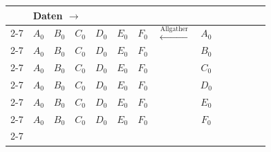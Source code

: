 \begin{figure}[tbp]
      \begin{subfigure}[l]{0.87\textwidth}
	\begin{tabular}[]{m{0.2cm} m{0.3cm}|m{0.3cm}|m{0.3cm}|m{0.3cm}|m{0.3cm}|m{0.3cm} m{1.5cm} m{0.3cm}|m{0.3cm}|m{0.3cm}|m{0.3cm}|m{0.3cm}|m{0.3cm}}
	  & \multicolumn{13}{l}{Daten $\longrightarrow$}\\
	  \cline{2-7} \cline{9-14}
	  \multirow{6}{*}{\begin{turn}{-90} Prozesse $\longrightarrow$ \end{turn}}
	  &\multicolumn{1}{|c|}{$A_0$}&$B_0$&$C_0$&$D_0$&$E_0$&\multicolumn{1}{|m{0.3cm}|}{$F_0$} &\multirow{6}{*}{\large $\xleftarrow{\text{Allgather}}$} & \multicolumn{1}{|c|}{$A_0$}& & & & &\multicolumn{1}{|m{0.3cm}|}{ }\\
	  \cline{2-7} \cline{9-14}
	  &\multicolumn{1}{|c|}{$A_0$}&$B_0$&$C_0$&$D_0$&$E_0$&\multicolumn{1}{|m{0.3cm}|}{$F_0$}                         & & \multicolumn{1}{|c|}{$B_0$}& & & & &\multicolumn{1}{|c|}{ }\\
	  \cline{2-7} \cline{9-14}
	  &\multicolumn{1}{|c|}{$A_0$}&$B_0$&$C_0$&$D_0$&$E_0$&\multicolumn{1}{|m{0.3cm}|}{$F_0$}                         & & \multicolumn{1}{|c|}{$C_0$}& & & & &\multicolumn{1}{|c|}{ }\\
	  \cline{2-7} \cline{9-14}
	  &\multicolumn{1}{|c|}{$A_0$}&$B_0$&$C_0$&$D_0$&$E_0$&\multicolumn{1}{|m{0.3cm}|}{$F_0$}                         & & \multicolumn{1}{|c|}{$D_0$}& & & & &\multicolumn{1}{|c|}{ }\\
	  \cline{2-7} \cline{9-14}
	  &\multicolumn{1}{|c|}{$A_0$}&$B_0$&$C_0$&$D_0$&$E_0$&\multicolumn{1}{|m{0.3cm}|}{$F_0$}                         & & \multicolumn{1}{|c|}{$E_0$}& & & & &\multicolumn{1}{|c|}{ }\\
	  \cline{2-7} \cline{9-14}
	  &\multicolumn{1}{|c|}{$A_0$}&$B_0$&$C_0$&$D_0$&$E_0$&\multicolumn{1}{|m{0.3cm}|}{$F_0$}                         & & \multicolumn{1}{|c|}{$F_0$}& & & & &\multicolumn{1}{|c|}{ }\\
	  \cline{2-7} \cline{9-14}
	\end{tabular}
      \end{subfigure}
      

\end{figure}
